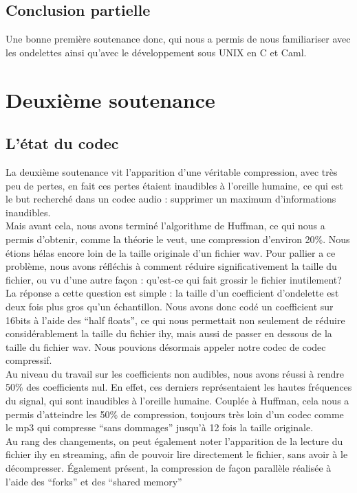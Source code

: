\documentclass[a4paper,12pt]{report}
\begin{document}
\subsection{Conclusion partielle}
Une bonne première soutenance donc, qui nous a permis de nous familiariser avec
les ondelettes ainsi qu'avec le développement sous UNIX en C et Caml.

\newpage

\section{Deuxième soutenance}
\subsection{L'état du codec}
La deuxième soutenance vit l'apparition d'une véritable compression, avec très
peu de pertes, en fait ces pertes étaient inaudibles à l'oreille humaine, ce qui
est le but recherché dans un codec audio : supprimer un maximum d'informations
inaudibles.\\
Mais avant cela, nous avons terminé l'algorithme de Huffman, ce qui nous a
permis d'obtenir, comme la théorie le veut, une compression d'environ 20\%. Nous
étions hélas encore loin de la taille originale d'un fichier wav. Pour pallier a
ce problème, nous avons réfléchis à comment réduire significativement la taille
du fichier, ou vu d'une autre façon : qu'est-ce qui fait grossir le fichier
inutilement? La réponse a cette question est simple : la taille d'un coefficient
d'ondelette est deux fois plus gros qu'un échantillon. Nous avons donc codé un
coefficient sur 16bits à l'aide des ``half floats'', ce qui nous permettait non
seulement de réduire considérablement la taille du fichier ihy, mais aussi de
passer en dessous de la taille du fichier wav. Nous pouvions désormais appeler
notre codec de codec compressif.\\
Au niveau du travail sur les coefficients non audibles, nous avons réussi à
rendre 50\% des coefficients nul. En effet, ces derniers représentaient les
hautes fréquences du signal, qui sont inaudibles à l'oreille humaine. Couplée à
Huffman, cela nous a permis d'atteindre les 50\% de compression, toujours très
loin d'un codec comme le mp3 qui compresse ``sans dommages'' jusqu'à 12 fois la
taille originale.\\
Au rang des changements, on peut également noter l'apparition de la lecture du
fichier ihy en streaming, afin de pouvoir lire directement le fichier, sans
avoir à le décompresser. Également présent, la compression de façon parallèle
réalisée à l'aide des ``forks'' et des ``shared memory''
\end{document}
